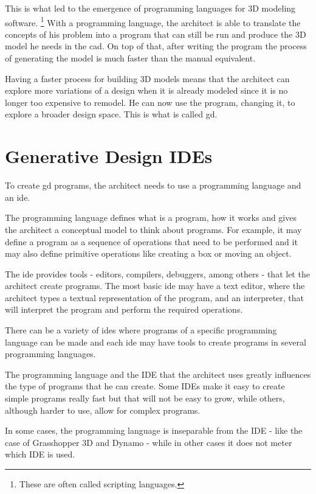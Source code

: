 This is what led to the emergence of programming languages for 3D modeling software.%
\footnote{These are often called scripting languages.}
With a programming language, the architect is able to translate the concepts of his problem into a program that can still be run and produce the 3D model he needs in the \gls{cad}.
On top of that, after writing the program the process of generating the model is much faster than the manual equivalent.

Having a faster process for building 3D models means that the architect can explore more variations of a design when it is already modeled since it is no longer too expensive to remodel.
He can now use the program, changing it, to explore a broader design space.
This is what is called \gls{gd}.


\section{Generative Design IDEs}
To create \gls{gd} programs, the architect needs to use a programming language and an \gls{ide}.

The programming language defines what is a program, how it works and gives the architect a conceptual model to think about programs.
For example, it may define a program as a sequence of operations that need to be performed and it may also define primitive operations like creating a box or moving an object.

The \gls{ide} provides tools - editors, compilers, debuggers, among others - that let the architect create programs.
The most basic \gls{ide} may have a text editor, where the architect types a textual representation of the program, and an interpreter, that will interpret the program and perform the required operations.

There can be a variety of \glspl{ide} where programs of a specific programming language can be made and each \gls{ide} may have tools to create programs in several programming languages.

The programming language and the IDE that the architect uses greatly influences the type of programs that he can create.
Some IDEs make it easy to create simple programs really fast but that will not be easy to grow, while others, although harder to use, allow for complex programs.

In some cases, the programming language is inseparable from the IDE - like the case of Grasshopper 3D and Dynamo - while in other cases it does not meter which IDE is used.

